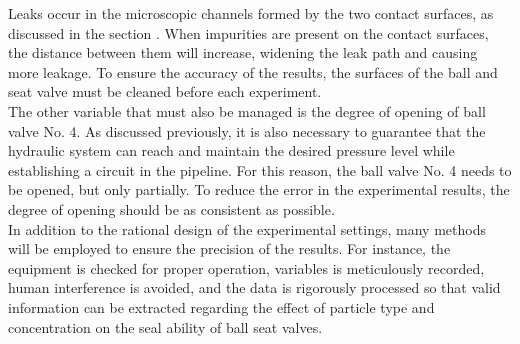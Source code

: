 Leaks occur in the microscopic channels formed by the two contact surfaces, 
as discussed in the section . When impurities are present
on the contact surfaces, the distance between them will increase, widening 
the leak path and causing more leakage. To ensure the accuracy of the results,
the surfaces of the ball and seat valve must be cleaned before each experiment.\\

The other variable that must also be managed is the degree of opening of ball 
valve No. 4. As discussed previously, it is also necessary to guarantee that 
the hydraulic system can reach and maintain the desired pressure level while 
establishing a circuit in the pipeline. For this reason, the ball valve No. 4 
needs to be opened, but only partially. To reduce the error in the experimental 
results, the degree of opening should be as consistent as possible.\\

In addition to the rational design of the experimental settings, many methods
will be employed to ensure the precision of the results. For instance,
the equipment is checked for proper operation, variables is meticulously 
recorded, human interference is avoided, and the data is rigorously processed 
so that valid information can be extracted regarding the effect of particle 
type and concentration on the seal ability of ball seat valves.